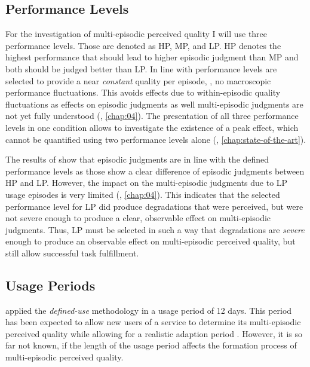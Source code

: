 \subsection{Performance Levels}
For the investigation of multi-episodic perceived quality I will use three performance levels.
Those are denoted as \acf{HP}, \acf{MP}, and \acf{LP}.
\ac{HP} denotes the highest performance that should lead to higher episodic judgment than \ac{MP} and both should be judged better than \ac{LP}.
In line with \citet{moller_single-call_2011} performance levels are selected to provide a near \emph{constant} quality per episode, \ie, no macroscopic performance fluctuations.
This avoids effects due to within-episodic quality fluctuations as effects on episodic judgments as well multi-episodic judgments are not yet fully understood (\cf, \autoref{chap:04}).
The presentation of all three performance levels in one condition allows to investigate the existence of a peak effect, which cannot be quantified using two performance levels alone (\cf, \autoref{chap:state-of-the-art}).

The results of \cite{moller_single-call_2011} show that episodic judgments are in line with the defined performance levels as those show a clear difference of episodic judgments between \ac{HP} and \ac{LP}.
However, the impact on the multi-episodic judgments due to \ac{LP} usage episodes is very limited (\cf, \autoref{chap:04}).
This indicates that the selected performance level for \ac{LP} did produce degradations that were perceived, but were not severe enough to produce a clear, observable effect on multi-episodic judgments.
Thus, \ac{LP} must be selected in such a way that degradations are \emph{severe} enough to produce an observable effect on multi-episodic perceived quality, but still allow successful task fulfillment.

\subsection{Usage Periods}
\citet{moller_single-call_2011} applied the \emph{defined-use} methodology in a usage period of 12 days. 
This period has been expected to allow new users of a service to determine its multi-episodic perceived quality while allowing for a realistic adaption period \citep[\cf,][]{moller_single-call_2011}.
However, it is so far not known, if the length of the usage period affects the formation process of multi-episodic perceived quality.

